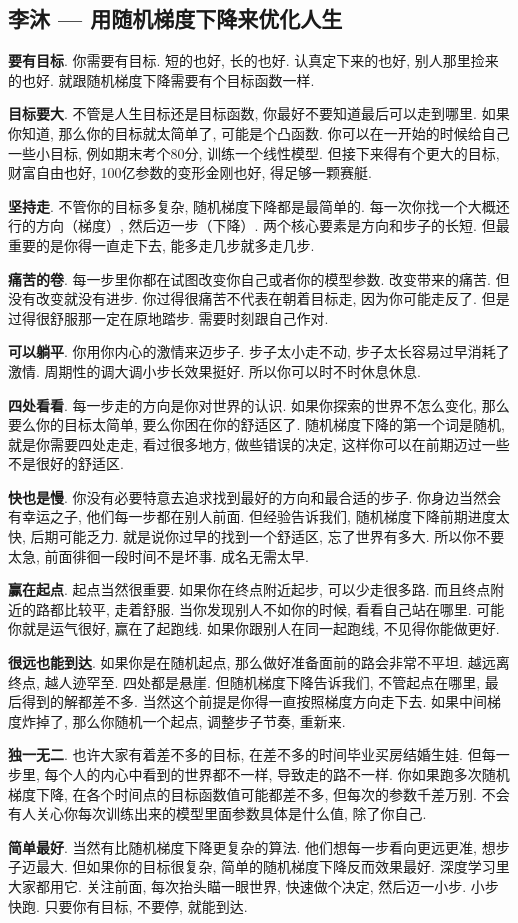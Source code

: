 \subsection{李沐 --- 用随机梯度下降来优化人生}
\textbf{要有目标}. 你需要有目标. 短的也好, 长的也好. 认真定下来的也好, 别人那里捡来的也好. 就跟随机梯度下降需要有个目标函数一样. 

\textbf{目标要大}. 不管是人生目标还是目标函数, 你最好不要知道最后可以走到哪里. 如果你知道, 那么你的目标就太简单了, 可能是个凸函数. 你可以在一开始的时候给自己一些小目标, 例如期末考个80分, 训练一个线性模型. 但接下来得有个更大的目标, 财富自由也好, 100亿参数的变形金刚也好, 得足够一颗赛艇. 

\textbf{坚持走}. 不管你的目标多复杂, 随机梯度下降都是最简单的. 每一次你找一个大概还行的方向（梯度）, 然后迈一步（下降）. 两个核心要素是方向和步子的长短. 但最重要的是你得一直走下去, 能多走几步就多走几步. 

\textbf{痛苦的卷}. 每一步里你都在试图改变你自己或者你的模型参数. 改变带来的痛苦. 但没有改变就没有进步. 你过得很痛苦不代表在朝着目标走, 因为你可能走反了. 但是过得很舒服那一定在原地踏步. 需要时刻跟自己作对. 

\textbf{可以躺平}. 你用你内心的激情来迈步子. 步子太小走不动, 步子太长容易过早消耗了激情. 周期性的调大调小步长效果挺好. 所以你可以时不时休息休息. 

\textbf{四处看看}. 每一步走的方向是你对世界的认识. 如果你探索的世界不怎么变化, 那么要么你的目标太简单, 要么你困在你的舒适区了. 随机梯度下降的第一个词是随机, 就是你需要四处走走, 看过很多地方, 做些错误的决定, 这样你可以在前期迈过一些不是很好的舒适区. 

\textbf{快也是慢}. 你没有必要特意去追求找到最好的方向和最合适的步子. 你身边当然会有幸运之子, 他们每一步都在别人前面. 但经验告诉我们, 随机梯度下降前期进度太快, 后期可能乏力. 就是说你过早的找到一个舒适区, 忘了世界有多大. 所以你不要太急, 前面徘徊一段时间不是坏事. 成名无需太早. 

\textbf{赢在起点}. 起点当然很重要. 如果你在终点附近起步, 可以少走很多路. 而且终点附近的路都比较平, 走着舒服. 当你发现别人不如你的时候, 看看自己站在哪里. 可能你就是运气很好, 赢在了起跑线. 如果你跟别人在同一起跑线, 不见得你能做更好. 

\textbf{很远也能到达}. 如果你是在随机起点, 那么做好准备面前的路会非常不平坦. 越远离终点, 越人迹罕至. 四处都是悬崖. 但随机梯度下降告诉我们, 不管起点在哪里, 最后得到的解都差不多. 当然这个前提是你得一直按照梯度方向走下去. 如果中间梯度炸掉了, 那么你随机一个起点, 调整步子节奏, 重新来. 

\textbf{独一无二}. 也许大家有着差不多的目标, 在差不多的时间毕业买房结婚生娃. 但每一步里, 每个人的内心中看到的世界都不一样, 导致走的路不一样. 你如果跑多次随机梯度下降, 在各个时间点的目标函数值可能都差不多, 但每次的参数千差万别. 不会有人关心你每次训练出来的模型里面参数具体是什么值, 除了你自己. 

\textbf{简单最好}. 当然有比随机梯度下降更复杂的算法. 他们想每一步看向更远更准, 想步子迈最大. 但如果你的目标很复杂, 简单的随机梯度下降反而效果最好. 深度学习里大家都用它. 关注前面, 每次抬头瞄一眼世界, 快速做个决定, 然后迈一小步. 小步快跑. 只要你有目标, 不要停, 就能到达. 
